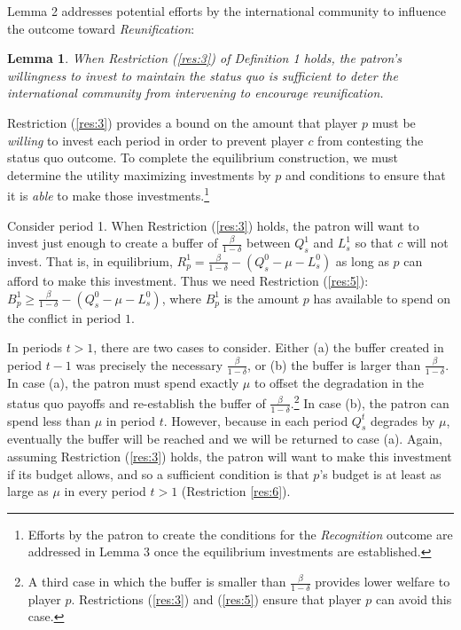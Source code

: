 \documentclass[11pt,letterpaper, notitlepage]{article}
\newtheorem{lemma}{Lemma}
\newcommand{\de}{\delta}
\begin{document}
Lemma 2 addresses potential efforts by the international community to influence the outcome toward \emph{Reunification}:

\begin{lemma}
When Restriction (\ref{res:3}) of Definition 1 holds, the patron's willingness to invest to maintain the status quo is sufficient to deter the international community from intervening to encourage reunification.
\end{lemma}

\noindent Restriction (\ref{res:3}) provides a bound on the amount that player $p$ must be \emph{willing} to invest each period in order to prevent player $c$ from contesting the status quo outcome. To complete the equilibrium construction, we must determine the utility maximizing investments by $p$ and conditions to ensure that it is \emph{able} to make those investments.\footnote{Efforts by the patron to create the conditions for the \emph{Recognition} outcome are addressed in Lemma 3 once the equilibrium investments are established.}

Consider period 1. When Restriction (\ref{res:3}) holds, the patron will want to invest just enough to create a buffer of $\frac{\beta}{1-\de}$ between $Q_s^1$ and $L_s^1$ so that $c$ will not invest. That is, in equilibrium, $R_p^1 = \frac{\beta}{1-\de} -(Q_s^0 - \mu - L_s^0)$ as long as $p$ can afford to make this investment. Thus we need Restriction (\ref{res:5}): $B_p^1 \geq\frac{\beta}{1-\de} - \left(Q_s^0 - \mu - L_s^0 \right)$, where $B_p^1$ is the amount $p$ has available to spend on the conflict in period $1$.

In periods $t > 1$, there are two cases to consider. Either (a) the buffer created in period $t-1$ was precisely the necessary $\frac{\beta}{1-\de}$, or (b) the buffer is larger than $\frac{\beta}{1-\de}$. In case (a), the patron must spend exactly $\mu$ to offset the degradation in the status quo payoffs and re-establish the buffer of $\frac{\beta}{1-\de}$.\footnote{A third case in which the buffer is smaller than $\frac{\beta}{1-\de}$ provides lower welfare to player $p$. Restrictions (\ref{res:3}) and (\ref{res:5}) ensure that player $p$ can avoid this case.} In case (b), the patron can spend less than $\mu$ in period $t$. However, because in each period $Q_s^t$ degrades by $\mu$, eventually the buffer will be reached and we will be returned to case (a). Again, assuming Restriction (\ref{res:3}) holds, the patron will want to make this investment if its budget allows, and so a sufficient condition is that $p$'s budget is at least as large as $\mu$ in every period $t > 1$ (Restriction \ref{res:6}). 
\end{document}
